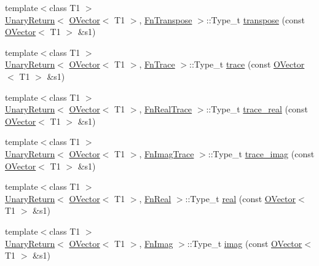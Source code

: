 \begin{DoxyCompactItemize}
\item 
{\footnotesize template$<$class T1 $>$ }\\\mbox{\hyperlink{structENSEM_1_1UnaryReturn}{Unary\+Return}}$<$ \mbox{\hyperlink{classENSEM_1_1OVector}{O\+Vector}}$<$ T1 $>$, \mbox{\hyperlink{structENSEM_1_1FnTranspose}{Fn\+Transpose}} $>$\+::Type\+\_\+t \mbox{\hyperlink{group__obsvector_ga9c3c97af68e1cfa2eb913c66fa87188b}{transpose}} (const \mbox{\hyperlink{classENSEM_1_1OVector}{O\+Vector}}$<$ T1 $>$ \&s1)
\item 
{\footnotesize template$<$class T1 $>$ }\\\mbox{\hyperlink{structENSEM_1_1UnaryReturn}{Unary\+Return}}$<$ \mbox{\hyperlink{classENSEM_1_1OVector}{O\+Vector}}$<$ T1 $>$, \mbox{\hyperlink{structENSEM_1_1FnTrace}{Fn\+Trace}} $>$\+::Type\+\_\+t \mbox{\hyperlink{group__obsvector_ga7b30f87898883f11b8b43b5b3df77bea}{trace}} (const \mbox{\hyperlink{classENSEM_1_1OVector}{O\+Vector}}$<$ T1 $>$ \&s1)
\item 
{\footnotesize template$<$class T1 $>$ }\\\mbox{\hyperlink{structENSEM_1_1UnaryReturn}{Unary\+Return}}$<$ \mbox{\hyperlink{classENSEM_1_1OVector}{O\+Vector}}$<$ T1 $>$, \mbox{\hyperlink{structENSEM_1_1FnRealTrace}{Fn\+Real\+Trace}} $>$\+::Type\+\_\+t \mbox{\hyperlink{group__obsvector_ga89062217a6c2e9173699e36b88ed9b05}{trace\+\_\+real}} (const \mbox{\hyperlink{classENSEM_1_1OVector}{O\+Vector}}$<$ T1 $>$ \&s1)
\item 
{\footnotesize template$<$class T1 $>$ }\\\mbox{\hyperlink{structENSEM_1_1UnaryReturn}{Unary\+Return}}$<$ \mbox{\hyperlink{classENSEM_1_1OVector}{O\+Vector}}$<$ T1 $>$, \mbox{\hyperlink{structENSEM_1_1FnImagTrace}{Fn\+Imag\+Trace}} $>$\+::Type\+\_\+t \mbox{\hyperlink{group__obsvector_ga42b95d27dd97c7484c4ddcc401aa305f}{trace\+\_\+imag}} (const \mbox{\hyperlink{classENSEM_1_1OVector}{O\+Vector}}$<$ T1 $>$ \&s1)
\item 
{\footnotesize template$<$class T1 $>$ }\\\mbox{\hyperlink{structENSEM_1_1UnaryReturn}{Unary\+Return}}$<$ \mbox{\hyperlink{classENSEM_1_1OVector}{O\+Vector}}$<$ T1 $>$, \mbox{\hyperlink{structENSEM_1_1FnReal}{Fn\+Real}} $>$\+::Type\+\_\+t \mbox{\hyperlink{group__obsvector_ga655235d17cdd06edc03c39a79f110d59}{real}} (const \mbox{\hyperlink{classENSEM_1_1OVector}{O\+Vector}}$<$ T1 $>$ \&s1)
\item 
{\footnotesize template$<$class T1 $>$ }\\\mbox{\hyperlink{structENSEM_1_1UnaryReturn}{Unary\+Return}}$<$ \mbox{\hyperlink{classENSEM_1_1OVector}{O\+Vector}}$<$ T1 $>$, \mbox{\hyperlink{structENSEM_1_1FnImag}{Fn\+Imag}} $>$\+::Type\+\_\+t \mbox{\hyperlink{group__obsvector_gaf1cbe27c6155721a04405dcecb528d53}{imag}} (const \mbox{\hyperlink{classENSEM_1_1OVector}{O\+Vector}}$<$ T1 $>$ \&s1)

\end{DoxyCompactItemize}
